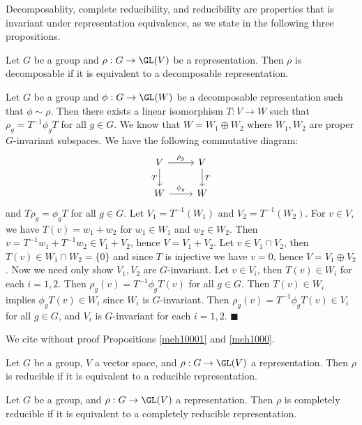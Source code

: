 \documentclass[../Project.tex]{subfiles}
\begin{document}
Decomposablity, complete reducibility, and reducibility are properties that is invariant under representation equivalence, as we state in the following three propositions.


\begin{prop}[{\cite[Lemma 3.1.23]{1}}]
	Let $G$ be a group and $\rho : G \to \GL(V)$ be a representation. Then $\rho$ is decomposable if it is equivalent to a  decomposable representation.
\end{prop}
\begin{proo*}[{\cite[Lemma 3.1.23]{1}}]
	Let $G$ be a group and $\phi : G \to \GL(W)$ be a decomposable representation such that $\phi \sim \rho$.
 Then there exists a linear isomorphism $T : V \to W$ such that $\rho_g = T^{-1}\phi_gT$ for all $g \in G$. We know that $W = W_1 \oplus W_2$ where $W_1,W_2$ are proper $G$-invariant subspaces. We have the following commutative diagram:
	$$
	\begin{tikzcd}
		V \arrow{r}{\rho_g} \arrow[swap]{d}{T} & V \arrow{d}{T} \\%
		W \arrow{r}{\phi_g}&W 
	\end{tikzcd}
	$$
	and $T\rho_g = \phi_gT$ for all $g \in G$. Let  $V_1 = T^{-1}(W_1)$ and $V_2 = T^{-1}(W_2)$. For $v \in V$, we have $T(v) = w_1 + w_2$ for $w_1 \in W_1$ and $w_2 \in W_2$. Then $v = T^{-1}w_1 + T^{-1}w_2 \in V_1 + V_2$, hence $V = V_1 + V_2$. Let $v \in V_1 \cap V_2$, then $T(v) \in W_1 \cap W_2 = \{0\}$ and since $T$ is injective we have $v = 0$, hence $V = V_1 \oplus V_2$. Now we need only show $V_1,V_2$ are $G$-invariant. Let $v \in V_i$, then $T(v) \in W_i$ for each $i = 1,2$. Then $\rho_g(v) = T^{-1}\phi_gT(v)$ for all $g \in G$. Then $T(v) \in W_i$ implies $\phi_gT(v) \in W_i$ since $W_i$ is $G$-invariant. Then $\rho_g(v) = T^{-1}\phi_gT(v) \in V_i$ for all $g \in G$, and $V_i$ is $G$-invariant for each $i = 1,2$. \hfill$\blacksquare$
\end{proo*}


We cite without proof Propositions \ref{meh10001} and \ref{meh1000}.
\begin{prop}[{\cite[Lemma 3.1.24]{1}}]
\label{meh10001}
	Let $G$ be a group, $V$ a vector space, and $\rho : G \to \GL(V)$ a representation. Then $\rho$ is reducible if it is equivalent to a reducible representation.
\end{prop}

\begin{prop}[{\cite[Lemma 3.1.25]{1}}]
\label{meh1000}
	Let $G$ be a group, and $\rho : G \to \GL(V)$ a representation. Then $\rho$ is completely reducible if it is equivalent to a completely reducible representation.\\
\end{prop}
\end{document}
